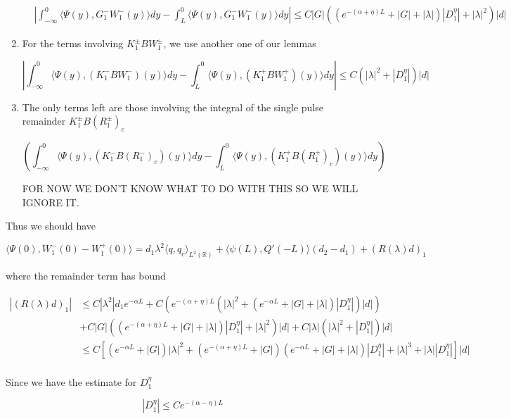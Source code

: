 \documentclass[12pt]{article}
\def\R{{\mathbb R}}
\begin{document}
\begin{enumerate}
\begin{align*}
&\left| \int_{-\infty}^0 \langle \Psi(y), G_1^- W_1^-(y) \rangle dy - \int_L^0 \langle \Psi(y), G_1^- W_1^-(y) \rangle dy\right| \leq C |G| \left( \left( e^{-(\alpha + \eta) L} + |G| + |\lambda|  \right) |D_1^{\eta}| + |\lambda|^2 \right)|d|
\end{align*}

\item For the terms involving $K_1^\pm B W_1^\pm$, we use another one of our lemmas

\[
\left| \int_{-\infty}^0 \langle \Psi(y), (K_1^- B W_1^-)(y) \rangle dy - \int_{L}^0 \langle \Psi(y), (K_1^+ B W_1^+)(y) \rangle dy \right| \leq C \left( |\lambda|^2 + |D_1^\eta|\right)|d|
\]

\item The only terms left are those involving the integral of the single pulse remainder $K_1^\pm B (R_1^\pm)_c$

\[
\left( \int_{-\infty}^0 \langle \Psi(y), (K_1^- B (R_1^-)_c)(y) \rangle dy - \int_{L}^0 \langle \Psi(y), (K_1^+ B (R_1^+)_c)(y) \rangle dy \right) 
\]

FOR NOW WE DON'T KNOW WHAT TO DO WITH THIS SO WE WILL IGNORE IT.

\end{enumerate}

Thus we should have

\[
\langle \Psi(0), W_1^-(0) - W_1^+(0) \rangle = 
d_1 \lambda^2 \langle q, q_c \rangle_{L^2(\R)} + \langle \psi(L), Q'(-L) \rangle(d_2 - d_1) + (R(\lambda)d)_1
\]

where the remainder term has bound

\begin{align*}
|(R(\lambda)d)_1| &\leq C |\lambda^2| d_1 e^{-\alpha L} + C \left( e^{-(\alpha +\eta) L}(|\lambda|^2 + (e^{-\alpha L} + |G| + |\lambda|)|D_1^\eta|)|d| \right) \\
&+ C |G| \left( \left( e^{-(\alpha + \eta) L} + |G| + |\lambda|  \right) |D_1^{\eta}| + |\lambda|^2 \right)|d| + C |\lambda| \left( |\lambda|^2 + |D_1^\eta|\right)|d| \\
&\leq C \left[ (e^{-\alpha L} + |G|) |\lambda|^2 + (e^{-(\alpha + \eta)L} + |G|)(e^{-\alpha L} + |G| + |\lambda|)|D_1^\eta| + |\lambda|^3 + |\lambda| |D_1^\eta| \right]|d|\\
\end{align*}

Since we have the estimate for $D_1^\eta$

\[
|D_1^\eta| \leq C e^{-(\alpha - \eta)L}
\]
\end{document}
